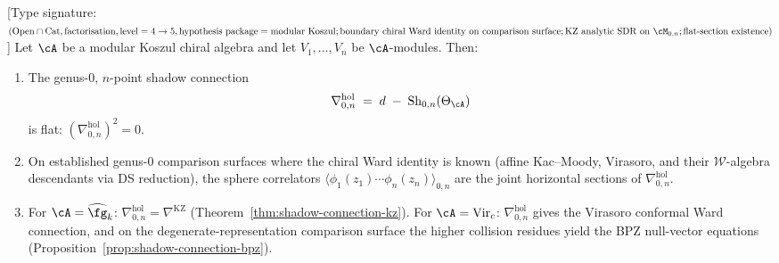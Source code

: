 \begin{theorem}
\label{thm:sphere-reconstruction}
\textup{[}Type signature:
$(\mathrm{Open}\cap\mathrm{Cat},\mathrm{factorisation},
\mathrm{level}=4\to 5,
\mathrm{hypothesis\ package}=\mathrm{modular\ Koszul};
\mathrm{boundary\ chiral\ Ward\ identity\ on\ comparison\ surface};
\mathrm{KZ\ analytic\ SDR\ on\ }\cM_{0,n};
\mathrm{flat\text{-}section\ existence})$\textup{]}
Let $\cA$ be a modular Koszul chiral algebra and let
$V_1,\dotsc,V_n$ be $\cA$-modules. Then:
\begin{enumerate}[label=\textup{(\roman*)}]
\item The genus-$0$, $n$-point shadow connection
\begin{equation}\label{eq:sphere-reconstruction}
\nabla^{\mathrm{hol}}_{0,n}
\;=\;
d \;-\; \operatorname{Sh}_{0,n}(\Theta_\cA)
\end{equation}
is flat: $(\nabla^{\mathrm{hol}}_{0,n})^2 = 0$.
\item On established genus-$0$ comparison surfaces where the chiral
Ward identity is known \textup{(}affine Kac--Moody, Virasoro, and
their $\mathcal{W}$-algebra descendants via DS reduction\textup{)},
the sphere correlators
$\langle \phi_1(z_1)\dotsm\phi_n(z_n)\rangle_{0,n}$
are the joint horizontal sections of\/ $\nabla^{\mathrm{hol}}_{0,n}$.
\item For $\cA = \widehat{\fg}_k$:
$\nabla^{\mathrm{hol}}_{0,n} = \nabla^{\mathrm{KZ}}$
\textup{(}Theorem~\textup{\ref{thm:shadow-connection-kz})}.
For $\cA = \mathrm{Vir}_c$:
$\nabla^{\mathrm{hol}}_{0,n}$ gives the Virasoro conformal Ward
connection, and on the degenerate-representation comparison surface
the higher collision residues yield the BPZ null-vector equations
\textup{(}Proposition~\textup{\ref{prop:shadow-connection-bpz})}.
\end{enumerate}
\end{theorem}

